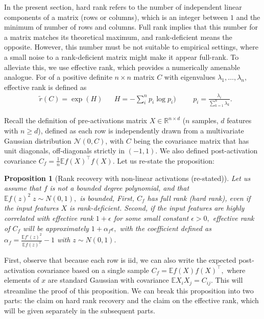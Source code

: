 \documentclass{article}
\newcommand{\R}{\mathbb{R}}
\newcommand{\E}{\mathbb{E}}
\newtheorem{proposition}{Proposition}[section]
\numberwithin{figure}{section}
\begin{document}
In the present section, hard rank refers to the number of independent linear components of a matrix (rows or columns), which is an integer between $1$ and the minimum of number of rows and columns. Full rank implies that this number for a matrix matches its theoretical maximum, and rank-deficient means the opposite. However, this number must be not suitable to empirical settings, where a small noise to a rank-deficient matrix might make it appear full-rank. To alleviate this, we use effective rank, which provides a numerically amenable analogue. For of a positive definite $n\times n$ matrix $C$ with eigenvalues $\lambda_1,\dots, \lambda_n,$ effective rank is defined as 
\begin{align*}
&\tilde{r}(C)= \exp(H) &&H =-\sum_i^n p_i\log p_i) &&&  p_i = \frac{\lambda_i}{\sum_{k=1}^n \lambda_k}.
\end{align*}

Recall the definition of pre-activations matrix $X \in \R^{n \times d}$ ($n$ samples, $d$ features with $n\ge d$), defined as each row is independently drawn from a multivariate Gaussian distribution $\mathcal{N}(0, C)$, with $C$ being the covariance matrix that has unit diagonals, off-diagonals strictly in $(-1,1)$. We also defined post-activation covariance $C_f = \frac1n \E f(X)^\top f(X).$ Let us re-state the proposition:

\begin{proposition}[Rank recovery with non-linear activations (re-stated)]
\label{prop:rank_recovery_restate}
Let us assume that  $f$ is not a bounded degree polynomial, and that $\E f(z)^2\; z\sim N(0,1),$ is bounded,  First, $C_f$ has full rank (hard rank), even if the input features $X$ is rank-deficient. Second, if the input features are highly correlated with effective rank $1+\epsilon$ for some small constant $\epsilon>0,$ effective rank of $C_f$ will be approximately  $1 + \alpha_f \epsilon,$ with the coefficient defined as $\alpha_f = \frac{\E f'(z)^2}{\E f(z)^2 } - 1$ with $z\sim N(0,1).$
\end{proposition}

First, observe that because each row is iid, we can also write the expected post-activation covariance based on a single sample $C_f = \E f(X) f(X)^\top,$ where elements of $x$ are standard Gaussian with covariance $\E X_i X_j = C_{ij}. $ This will streamline the proof of this proposition.  We can break this proposition into two parts: the claim on hard rank recovery and the claim on the effective rank, which will be given separately in the subsequent parts. 
\end{document}
